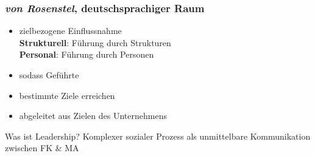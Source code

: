 \documentclass{cheatsheet}
\begin{document}
    \begin{normbox}{\subsubsection{\emph{von Rosenstel}, deutschsprachiger Raum}}
        \begin{itemize}
            \item zielbezogene Einflussnahme\\
            \ra \textbf{Strukturell}: Führung durch Strukturen\\
            \ra \textbf{Personal}: Führung durch Personen
            \item sodass Geführte
            \item bestimmte Ziele erreichen
            \item abgeleitet aus Zielen des Unternehmens
        \end{itemize}
    \end{normbox}
    \begin{warningbox}{Was ist Leadership?}
        Komplexer sozialer Prozess als unmittelbare Kommunikation zwischen FK \& MA
    \end{warningbox}
\end{document}
